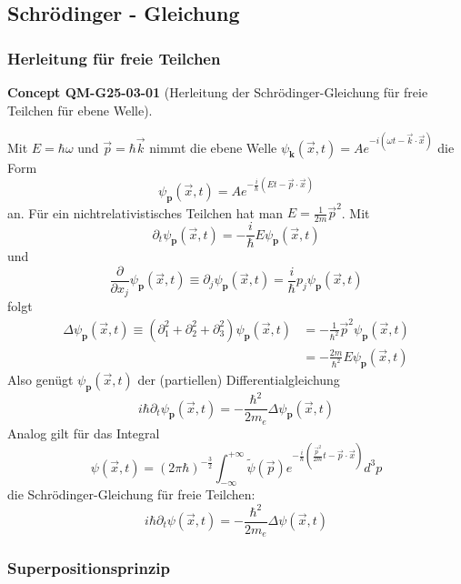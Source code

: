 \documentclass[10pt, letterpaper]{article}
\newcommand{\CustomHeading}[3]{%
  \par\medskip\noindent%
  \textbf{#1 #2} \textnormal{(#3)}.\enskip%
}
\newenvironment{CONC}[2]{\begin{unitbox}\CustomHeading{Concept}{#1}{#2}}{\end{unitbox}}
\begin{document}
\subsection{Schrödinger - Gleichung}



\subsubsection{Herleitung für freie Teilchen}



\begin{CONC}{QM-G25-03-01}{Herleitung der Schrödinger-Gleichung für freie Teilchen für ebene Welle}
Mit $E=\hbar \omega$ und $\vec{p}=\hbar \vec{k}$ nimmt die ebene Welle $\psi_{\mathbf{k}}(\vec{x}, t)=A e^{-i(\omega t-\vec{k} \cdot \vec{x})}$ die Form
$$
\psi_{\mathbf{p}}(\vec{x}, t)=A e^{-\frac{i}{\hbar}(E t-\vec{p} \cdot \vec{x})}
$$
an. Für ein nichtrelativistisches Teilchen hat man $E=\frac{1}{2 m} \vec{p}^{2}$. Mit
$$
\partial_{t} \psi_{\mathbf{p}}(\vec{x}, t)=-\frac{i}{\hbar} E \psi_{\mathbf{p}}(\vec{x}, t)
$$
und
$$
\frac{\partial}{\partial x_{j}} \psi_{\mathbf{p}}(\vec{x}, t) \equiv \partial_{j} \psi_{\mathbf{p}}(\vec{x}, t)=\frac{i}{\hbar} p_{j} \psi_{\mathbf{p}}(\vec{x}, t)
$$
folgt
$$
\begin{aligned}
\Delta \psi_{\mathbf{p}}(\vec{x}, t) \equiv\left(\partial_{1}^{2}+\partial_{2}^{2}+\partial_{3}^{2}\right) \psi_{\mathbf{p}}(\vec{x}, t) & =-\frac{1}{\hbar^{2}} \vec{p}^{2} \psi_{\mathbf{p}}(\vec{x}, t) \\
& =-\frac{2 m}{\hbar^{2}} E \psi_{\mathbf{p}}(\vec{x}, t)
\end{aligned}
$$
Also genügt $\psi_{\mathbf{p}}(\vec{x}, t)$ der (partiellen) Differentialgleichung
$$
i \hbar \partial_{t} \psi_{\mathbf{p}}(\vec{x}, t)=-\frac{\hbar^{2}}{2 m_{e}} \Delta \psi_{\mathbf{p}}(\vec{x}, t)
$$
Analog gilt für das Integral
$$
\psi(\vec{x}, t)=(2 \pi \hbar)^{-\frac{3}{2}} \int_{-\infty}^{+\infty} \widetilde{\psi}(\vec{p}) e^{-\frac{i}{\hbar}\left(\frac{\vec{p}^{2}}{2 m} t-\vec{p} \cdot \vec{x}\right)} d^{3} p
$$
die Schrödinger-Gleichung für freie Teilchen:
$$
i \hbar \partial_{t} \psi(\vec{x}, t)=-\frac{\hbar^{2}}{2 m_{e}} \Delta \psi(\vec{x}, t)
$$
\end{CONC}

\subsubsection*{Superpositionsprinzip}
\end{document}
